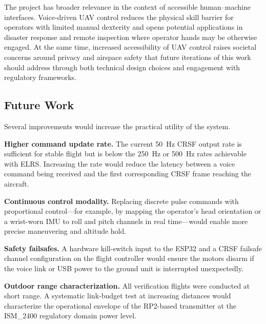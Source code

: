 The project has broader relevance in the context of accessible human--machine interfaces.
Voice-driven UAV control reduces the physical skill barrier for operators with limited manual
dexterity and opens potential applications in disaster response and remote inspection where
operator hands may be otherwise engaged.
At the same time, increased accessibility of UAV control raises societal concerns around privacy
and airspace safety that future iterations of this work should address through both technical
design choices and engagement with regulatory frameworks.

\subsection{Future Work}

Several improvements would increase the practical utility of the system.

\textbf{Higher command update rate.}
The current 50~Hz CRSF output rate is sufficient for stable flight but is below the 250~Hz or
500~Hz rates achievable with ELRS.
Increasing the rate would reduce the latency between a voice command being received and the
first corresponding CRSF frame reaching the aircraft.

\textbf{Continuous control modality.}
Replacing discrete pulse commands with proportional control---for example, by mapping the
operator's head orientation or a wrist-worn IMU to roll and pitch channels in real time---would
enable more precise maneuvering and altitude hold.

\textbf{Safety failsafes.}
A hardware kill-switch input to the ESP32 and a CRSF failsafe channel configuration on the
flight controller would ensure the motors disarm if the voice link or USB power to the ground
unit is interrupted unexpectedly.

\textbf{Outdoor range characterization.}
All verification flights were conducted at short range.
A systematic link-budget test at increasing distances would characterize the operational envelope
of the RP2-based transmitter at the ISM\_2400 regulatory domain power level.
